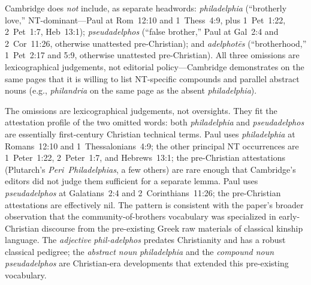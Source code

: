 \documentclass[12pt,oneside]{article}
\newcommand{\grk}[1]{\textit{#1}}   %
\begin{document}
Cambridge does \textit{not} include, as separate headwords:
\grk{philadelphia} (\enquote{brotherly love,} NT-dominant---Paul
at Rom~12:10 and 1~Thess~4:9, plus 1~Pet~1:22, 2~Pet~1:7, Heb~13:1);
\grk{pseudadelphos} (\enquote{false brother,} Paul at Gal~2:4 and
2~Cor~11:26, otherwise unattested pre-Christian); and
\grk{adelphot\=es} (\enquote{brotherhood,} 1~Pet~2:17 and 5:9,
otherwise unattested pre-Christian).  All three omissions are
lexicographical judgements, not editorial policy---Cambridge
demonstrates on the same pages that it is willing to list
NT-specific compounds and parallel abstract nouns (e.g.,
\grk{philandria} on the same page as the absent
\grk{philadelphia}).

The omissions are lexicographical judgements, not oversights.  They
fit the attestation profile of the two omitted words: both
\grk{philadelphia} and \grk{pseudadelphos} are essentially
first-century Christian technical terms.  Paul uses
\grk{philadelphia} at Romans~12:10 and 1~Thessalonians~4:9; the
other principal NT occurrences are 1~Peter~1:22, 2~Peter~1:7, and
Hebrews~13:1; the pre-Christian attestations (Plutarch's
\textit{Peri~Philadelphias}, a few others) are rare enough that
Cambridge's editors did not judge them sufficient for a separate
lemma.  Paul uses \grk{pseudadelphos} at Galatians~2:4 and
2~Corinthians~11:26; the pre-Christian attestations are effectively
nil.  The pattern is consistent with the paper's broader
observation that the community-of-brothers vocabulary was
specialized in early-Christian discourse from the pre-existing
Greek raw materials of classical kinship language.  The
\textit{adjective} \grk{phil-adelphos} predates Christianity and
has a robust classical pedigree; the \textit{abstract noun}
\grk{philadelphia} and the \textit{compound noun}
\grk{pseudadelphos} are Christian-era developments that extended
this pre-existing vocabulary.
\end{document}
